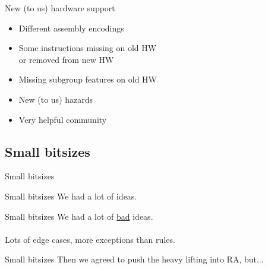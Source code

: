 \documentclass[aspectratio=169,t,xcolor=table]{beamer}
\begin{document}
\begin{frame}{New (to us) hardware support}
    \LARGE
    \begin{itemize}
        \item Different assembly encodings
        \item Some instructions missing on old HW \\
              or removed from new HW
        \item Missing subgroup features on old HW
        \item New (to us) hazards
        \item Very helpful community
    \end{itemize}
\end{frame}

\subsection{Small bitsizes}

\begin{frame}{Small bitsizes}
\end{frame}

\begin{frame}{Small bitsizes}
    \LARGE
    We had a lot of ideas.
\end{frame}

\begin{frame}{Small bitsizes}
    \LARGE
    We had a lot of \Huge\underline{bad} \LARGE ideas.
    \normalsize
    \ \\
    \ \\
    Lots of edge cases, more exceptions than rules.
\end{frame}

\begin{frame}{Small bitsizes}
    \LARGE
    Then we agreed to push the heavy lifting into RA, but...
\end{frame}
\end{document}
